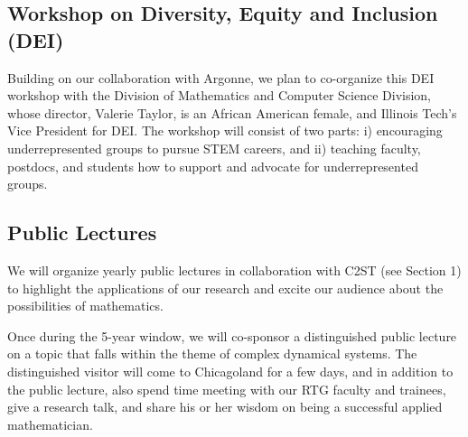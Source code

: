 \documentclass[11pt]{NSFamsart}
\begin{document}

\subsection*{Workshop on Diversity, Equity and Inclusion (DEI)}
Building on our collaboration with Argonne, we plan to co-organize this DEI workshop with the Division of Mathematics and Computer Science Division, whose director, Valerie Taylor, is an African American female, and Illinois Tech's  Vice President for DEI.  The workshop will consist of two parts: i) encouraging underrepresented groups to pursue STEM careers, and ii) teaching faculty, postdocs, and students how to support and advocate for underrepresented groups.

\subsection*{Public Lectures} We will organize yearly public lectures in collaboration with  C2ST (see Section 1) to highlight the applications of   our research and excite our audience about the possibilities of mathematics.  

Once during the 5-year window, we will co-sponsor a distinguished public lecture  on a topic that falls within the theme of complex dynamical systems.  The distinguished visitor will come to Chicagoland for a few days, and in addition to the public lecture, also spend time meeting with our RTG faculty and trainees, give a research talk, and share his or her wisdom on being a successful applied mathematician. 

\end{document}
